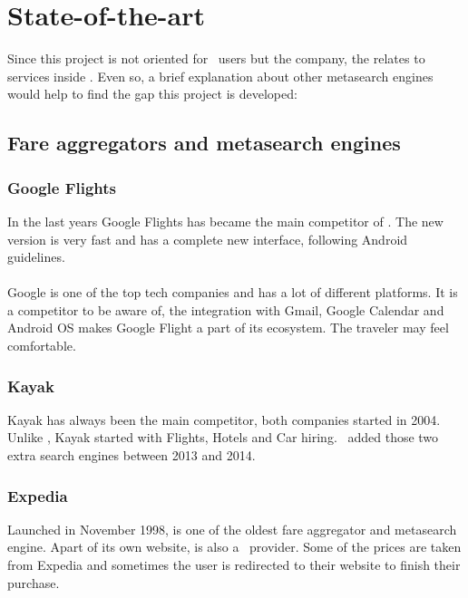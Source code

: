 
\chapter{State-of-the-art}

\label{chapter02}

Since this project is not oriented for \company\ users but the company, the \textit{} relates to services inside \company. Even so, a brief explanation about other metasearch engines would help to find the gap this project is developed:

\section{Fare aggregators and metasearch engines}

\subsection{Google Flights}

In the last years Google Flights has became the main competitor of \company. The new version is very fast and has a complete new interface, following Android guidelines.
\\\\
Google is one of the top tech companies and has a lot of different platforms. It is a competitor to be aware of, the integration with Gmail, Google Calendar and Android OS makes Google Flight a part of its ecosystem. The traveler may feel comfortable.

\subsection{Kayak}

Kayak has always been the main competitor, both companies started in 2004. Unlike \company, Kayak started with Flights, Hotels and Car hiring. \company\ added those two extra search engines between 2013 and 2014.

\subsection{Expedia}

Launched in November 1998, is one of the oldest fare aggregator and metasearch engine. Apart of its own website, is also a \company\ provider. Some of the prices are taken from Expedia and sometimes the user is redirected to their website to finish their purchase.

